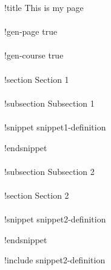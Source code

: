 \documentclass[preview]{standalone}
\begin{document}
!title This is my page
\\\\
!gen-page true
\\\\
!gen-course true
\\\\
!section Section 1
\\\\
!subsection Subsection 1
\\\\
!snippet snippet1-definition


!endsnippet
\\\\
!subsection Subsection 2
\\\\
!section Section 2
\\\\
!snippet snippet2-definition


!endsnippet

!include snippet2-definition
\end{document}

